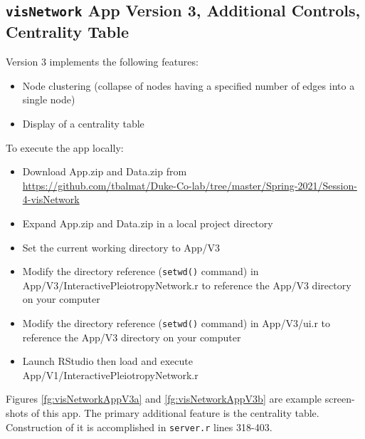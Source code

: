 \documentclass[10pt, letterpaper]{article}
\begin{document}
\begin{spacing}{1.0}

\subsection{\texttt{visNetwork} App Version 3, Additional Controls, Centrality Table}\label{sec:visNetworkV3}

Version 3 implements the following features:

\begin{itemize}[noitemsep]
    \item Node clustering (collapse of nodes having a specified number of edges into a single node)
    \item Display of a centrality table
\end{itemize}

To execute the app locally:

\begin{itemize}[noitemsep]
    \item Download App.zip and Data.zip from\\ \url{https://github.com/tbalmat/Duke-Co-lab/tree/master/Spring-2021/Session-4-visNetwork}
    \item Expand App.zip and Data.zip in a local project directory
    \item Set the current working directory to App/V3
    \item Modify the directory reference (\texttt{setwd()} command) in App/V3/InteractivePleiotropyNetwork.r to reference the App/V3 directory on your computer
    \item Modify the directory reference (\texttt{setwd()} command) in App/V3/ui.r to reference the App/V3 directory on your computer
    \item Launch RStudio then load and execute App/V1/InteractivePleiotropyNetwork.r
\end{itemize}

Figures \ref{fg:visNetworkAppV3a} and \ref{fg:visNetworkAppV3b} are example screen-shots of this app.  The primary additional feature is the centrality table.  Construction of it is accomplished in \texttt{server.r} lines 318-403.\\


\end{spacing}
\end{document}
